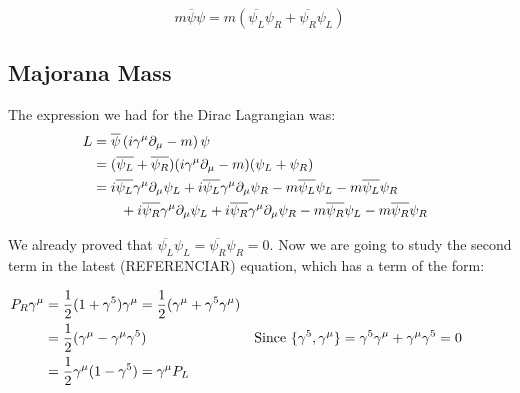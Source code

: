 \begin{equation}
  m \overline{\psi} \psi = m (\overline{\psi_L} \psi_R + \overline{\psi_R}\psi_L)
\end{equation}

\subsection{Majorana Mass}

The expression we had for the Dirac Lagrangian was: 
\begin{align}
  &\begin{aligned}
    \mathllap{L} &= \overline{\psi} \left( i \gamma ^\mu \partial_{\mu} - m \right) \psi \\
    \mathllap{}  &= (\overline{\psi_L} + \overline{\psi_R})( i \gamma ^\mu \partial_{\mu} - m)(\psi_L + \psi_R) \\
    \mathllap{}  &= i \overline{\psi_L} \gamma ^\mu \partial_{\mu} \psi_L + i \overline{\psi_L} \gamma ^\mu   \partial_{\mu} \psi_R - m \overline{\psi_L} \psi_L - m \overline{\psi_L} \psi_R \\
  &\qquad + i \overline{\psi_R} \gamma ^\mu \partial_{\mu} \psi_L + i \overline{\psi_R} \gamma^{\mu} \partial_{\mu} \psi_R - m \overline{\psi_R} \psi_L - m \overline{\psi_R} \psi_R \\
  \end{aligned}\\
\end{align}

We already proved that $\overline{\psi_L}\psi_L = \overline{\psi_R}\psi_R = 0$. Now we are going to study the second term in the latest (REFERENCIAR) equation, which has a term of the form:

\begin{align}
  &\begin{aligned}
     \mathllap{P_R\gamma^\mu}  &= \frac{1}{2} (1 + \gamma^5)\gamma^\mu = \frac{1}{2} (\gamma^\mu + \gamma^5 \gamma^\mu) \\        
     \mathllap{}            &= \frac{1}{2} (\gamma^\mu - \gamma^\mu \gamma^5) & \text{Since $\{\gamma^5,\gamma^\mu\} = \gamma^5\gamma^\mu + \gamma^\mu \gamma^5 = 0$} \\
     \mathllap{}            &= \frac{1}{2} \gamma^\mu (1 - \gamma^5) = \gamma^\mu P_L 
  &\end{aligned}
\end{align}

